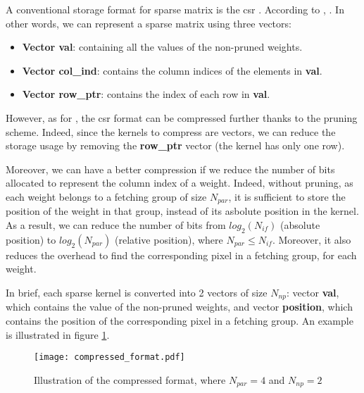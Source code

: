 A conventional storage format for sparse matrix is the \acrfull{csr} \cite{buluc_parallel_2009}. According to \textcite{buluc_parallel_2009}, . In other words, we can represent a sparse matrix using three vectors:
%
\begin{itemize}
    \item \textbf{Vector val}: containing all the values of the non-pruned weights.
    \item \textbf{Vector col\_ind}: contains the column indices of the elements in \textbf{val}.
    \item \textbf{Vector row\_ptr}: contains the index of each row in \textbf{val}.
\end{itemize}
%
However, as for \cite{zhu_efficient_2020}, the \acrshort{csr} format can be compressed further thanks to the pruning scheme. Indeed, since the kernels to compress are vectors, we can reduce the storage usage by removing the \textbf{row\_ptr} vector (the kernel has only one row). 

Moreover, we can have a better compression if we reduce the number of bits allocated to represent the column index of a weight. Indeed, without pruning, as each weight belongs to a fetching group of size $N_{par}$, it is sufficient to store the position of the weight in that group, instead of its asbolute position in the kernel. As a result, we can reduce the number of bits from $log_2(N_{if})$ (absolute position) to $log_2(N_{par})$ (relative position), where $N_{par} \leq N_{if}$. Moreover, it also reduces the overhead to find the corresponding pixel in a fetching group, for each weight.

In brief, each sparse kernel is converted into 2 vectors of size $N_{np}$: vector \textbf{val}, which contains the value of the non-pruned weights, and vector \textbf{position}, which contains the position of the corresponding pixel in a fetching group. An example is illustrated in figure \ref{fig:compressed_format}.
%
\begin{figure}[H]
    \centering
    \texttt{[image: compressed\_format.pdf]}
    \caption{Illustration of the compressed format, where $N_{par} = 4$ and $N_{np} = 2$}
    \label{fig:compressed_format}
\end{figure}

